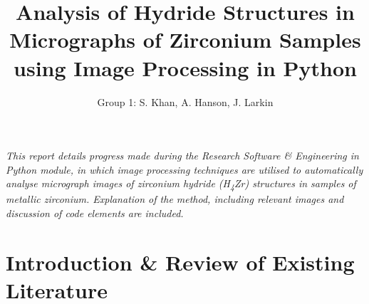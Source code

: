 \documentclass{article}
\title{Analysis of Hydride Structures in Micrographs of Zirconium Samples using Image Processing in Python}
\author{Group 1: S. Khan, A. Hanson, J. Larkin}
\begin{document}
	\maketitle
	
	\begin{center} \textit{This report details progress made during the Research Software \& Engineering in Python module, in which image processing techniques are utilised to automatically analyse micrograph images of zirconium hydride (H\textsubscript{4}Zr) structures in samples of metallic zirconium. Explanation of the method, including relevant images and discussion of code elements are included.} \end{center}
	
	\section{Introduction \& Review of Existing Literature}
\end{document}
